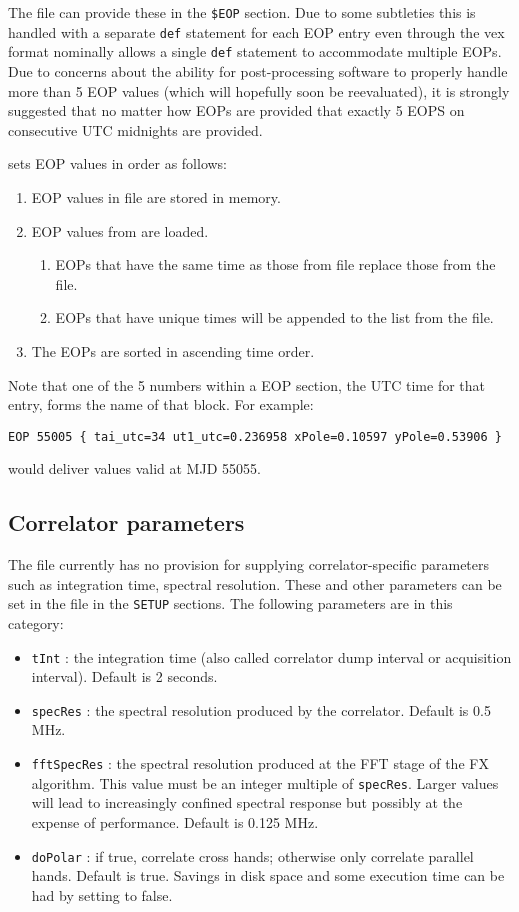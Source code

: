 \documentclass[12pt]{article}
\begin{document}
The \vx file can provide these in the {\tt \$EOP} section.
Due to some subtleties this is handled with a separate {\tt def} statement for each EOP entry even through the vex format nominally allows a single {\tt def} statement to accommodate multiple EOPs.
Due to concerns about the ability for post-processing software to properly handle more than 5 EOP values (which will hopefully soon be reevaluated), it is strongly suggested that no matter how EOPs are provided that exactly 5 EOPS on consecutive UTC midnights are provided.

\vd sets EOP values in order as follows:
\begin{enumerate}
\item EOP values in \vx file are stored in memory.
\item EOP values from \vd are loaded.
\begin{enumerate}
\item EOPs that have the same time as those from \vx file replace those from the \vx file.
\item EOPs that have unique times will be appended to the list from the \vx file.
\end{enumerate}
\item The EOPs are sorted in ascending time order.
\end{enumerate}

Note that one of the 5 numbers within a \vd EOP section, the UTC time for that entry, forms the name of that block.
For example:

{\tt EOP 55005 \{ tai\_utc=34 ut1\_utc=0.236958 xPole=0.10597 yPole=0.53906 \} }

\noindent
would deliver values valid at MJD 55055.

\subsection{Correlator parameters}

The \vx file currently has no provision for supplying correlator-specific parameters such as integration time, spectral resolution.
These and other parameters can be set in the \vd file in the {\tt SETUP} sections.
The following parameters are in this category:
\begin{itemize}
\item {\tt tInt} : the integration time (also called correlator dump interval or acquisition interval).  Default is 2 seconds.
\item {\tt specRes} : the spectral resolution produced by the correlator.  Default is 0.5 MHz.
\item {\tt fftSpecRes} : the spectral resolution produced at the FFT stage of the FX algorithm.  This value must be an integer multiple of {\tt specRes}.  Larger values will lead to increasingly confined spectral response but possibly at the expense of performance.  Default is 0.125 MHz.
\item {\tt doPolar} : if true, correlate cross hands; otherwise only correlate parallel hands.  Default is true.  Savings in disk space and some execution time can be had by setting to false.

\end{itemize}
\end{document}
